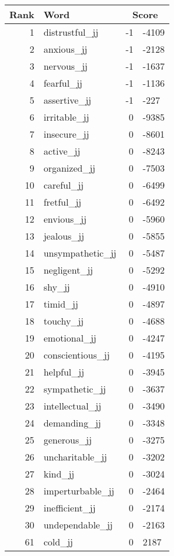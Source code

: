 \begin{longtable}[!htbp]{| rlr@{.}l |}
    \hline
    \textbf{Rank} & \textbf{Word} & \multicolumn{2}{c|}{\textbf{Score}} \\
    \hline
    \endhead
    1 & distrustful\_jj & -1 & -4109 \\
    2 & anxious\_jj & -1 & -2128 \\
    3 & nervous\_jj & -1 & -1637 \\
    4 & fearful\_jj & -1 & -1136 \\
    5 & assertive\_jj & -1 & -227 \\
    6 & irritable\_jj & 0 & -9385 \\
    7 & insecure\_jj & 0 & -8601 \\
    8 & active\_jj & 0 & -8243 \\
    9 & organized\_jj & 0 & -7503 \\
    10 & careful\_jj & 0 & -6499 \\
    11 & fretful\_jj & 0 & -6492 \\
    12 & envious\_jj & 0 & -5960 \\
    13 & jealous\_jj & 0 & -5855 \\
    14 & unsympathetic\_jj & 0 & -5487 \\
    15 & negligent\_jj & 0 & -5292 \\
    16 & shy\_jj & 0 & -4910 \\
    17 & timid\_jj & 0 & -4897 \\
    18 & touchy\_jj & 0 & -4688 \\
    19 & emotional\_jj & 0 & -4247 \\
    20 & conscientious\_jj & 0 & -4195 \\
    21 & helpful\_jj & 0 & -3945 \\
    22 & sympathetic\_jj & 0 & -3637 \\
    23 & intellectual\_jj & 0 & -3490 \\
    24 & demanding\_jj & 0 & -3348 \\
    25 & generous\_jj & 0 & -3275 \\
    26 & uncharitable\_jj & 0 & -3202 \\
    27 & kind\_jj & 0 & -3024 \\
    28 & imperturbable\_jj & 0 & -2464 \\
    29 & inefficient\_jj & 0 & -2174 \\
    30 & undependable\_jj & 0 & -2163 \\
    61 & cold\_jj & 0 & 2187 \\

\end{longtable}

